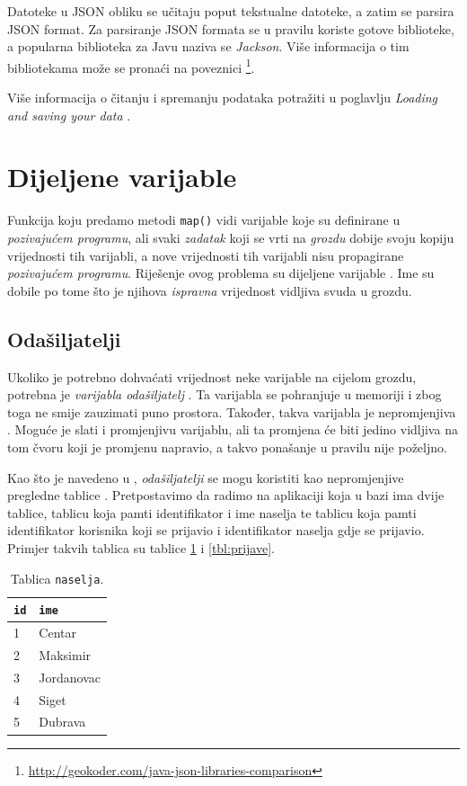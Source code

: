\documentclass[times, utf8, zavrsni, numeric]{fer}
\begin{document}
Datoteke u JSON obliku se učitaju poput tekstualne datoteke, a zatim se parsira JSON format. Za parsiranje JSON formata se u pravilu koriste gotove biblioteke, a popularna biblioteka za Javu naziva se \emph{Jackson}. Više informacija o tim bibliotekama može se pronaći na poveznici \footnote{\url{http://geokoder.com/java-json-libraries-comparison}}. 

Više informacija o čitanju i spremanju podataka potražiti u poglavlju \emph{Loading and saving your data} \cite{learningSpark}.

\section{Dijeljene varijable}
Funkcija koju predamo metodi \texttt{map()} vidi varijable koje su definirane u \emph{pozivajućem programu}, ali svaki \emph{zadatak}  koji se vrti na \emph{grozdu} dobije svoju kopiju vrijednosti tih varijabli, a nove vrijednosti tih varijabli nisu propagirane \emph{pozivajućem programu}. Riješenje ovog problema su dijeljene varijable . Ime su dobile po tome što je njihova \emph{ispravna} vrijednost vidljiva svuda u grozdu.

\subsection{Odašiljatelji}
Ukoliko je potrebno dohvaćati vrijednost neke varijable na cijelom grozdu, potrebna je \emph{varijabla odašiljatelj} . Ta varijabla se pohranjuje u memoriji i zbog toga ne smije zauzimati puno prostora. Također, takva varijabla je nepromjenjiva . Moguće je slati i promjenjivu varijablu, ali ta promjena će biti jedino vidljiva na tom čvoru koji je promjenu napravio, a takvo ponašanje u pravilu nije poželjno. 

Kao što je navedeno u \cite{officialDocumentation}, \emph{odašiljatelji} se mogu koristiti kao nepromjenjive pregledne tablice . 
Pretpostavimo da radimo na aplikaciji koja u bazi ima dvije tablice, tablicu koja pamti identifikator i ime naselja te tablicu koja pamti identifikator korisnika koji se prijavio i identifikator naselja gdje se prijavio. Primjer takvih tablica su tablice \ref{tbl:naselja} i \ref{tbl:prijave}.

\begin{table}[htb]
\caption{Tablica \texttt{naselja}.}
\label{tbl:naselja}
\centering
\begin{tabular}{ll} 
\hline
\texttt{id} & \texttt{ime}\\
\hline
1 & Centar\\
2 & Maksimir\\
3 & Jordanovac\\
4 & Siget\\
5 & Dubrava\\
\hline
\end{tabular}
\end{table}
\end{document}
